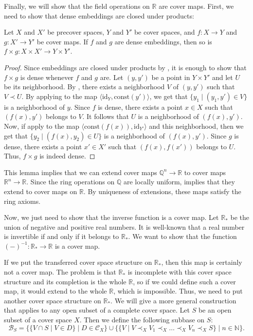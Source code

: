 \documentclass[reqno]{amsart}
\theoremstyle{definition}
\theoremstyle{remark}
\numberwithin{figure}{section}
\newcommand{\rb}{\prec}
\begin{document}
Finally, we will show that the field operations on $\mathbb{R}$ are cover maps.
First, we need to show that dense embeddings are closed under products:

\begin{lem}
Let $X$ and $X'$ be precover spaces, $Y$ and $Y'$ be cover spaces, and $f : X \to Y$ and $g : X' \to Y'$ be cover maps.
If $f$ and $g$ are dense embeddings, then so is $f \times g : X \times X' \to Y \times Y'$.
\end{lem}
\begin{proof}
Since embeddings are closed under products by , it is enough to show that $f \times g$ is dense whenever $f$ and $g$ are.
Let $(y,y')$ be a point in $Y \times Y'$ and let $U$ be its neighborhood.
By , there exists a neighborhood $V$ of $(y,y')$ such that $V \rb U$.
By applying  to the map $\langle \mathrm{id}_Y, \mathrm{const}(y') \rangle$, we get that $\{ y_1 \mid (y_1,y') \in V \}$ is a neighborhood of $y$.
Since $f$ is dense, there exists a point $x \in X$ such that $(f(x),y')$ belongs to $V$.
It follows that $U$ is a neighborhood of $(f(x),y')$.
Now, if apply  to the map $\langle \mathrm{const}(f(x)), \mathrm{id}_{Y'} \rangle$ and this neighborhood,
then we get that $\{ y_2 \mid (f(x),y_2) \in U \}$ is a neighborhood of $(f(x),y')$.
Since $g$ is dense, there exists a point $x' \in X'$ such that $(f(x),f(x'))$ belongs to $U$.
Thus, $f \times g$ is indeed dense.
\end{proof}

This lemma implies that we can extend cover maps $\mathbb{Q}^n \to \mathbb{R}$ to cover maps $\mathbb{R}^n \to \mathbb{R}$.
Since the ring operations on $\mathbb{Q}$ are locally uniform,  implies that they extend to cover maps on $\mathbb{R}$.
By uniqueness of extensions, these maps satisfy the ring axioms.

Now, we just need to show that the inverse function is a cover map.
Let $\mathbb{R}_*$ be the union of negative and positive real numbers.
It is well-known that a real number is invertible if and only if it belongs to $\mathbb{R}_*$.
We want to show that the function $(-)^{-1} : \mathbb{R}_* \to \mathbb{R}$ is a cover map.

If we put the transferred cover space structure on $\mathbb{R}_*$, then this map is certainly not a cover map.
The problem is that $\mathbb{R}_*$ is incomplete with this cover space structure and its completion is the whole $\mathbb{R}$,
so if we could define such a cover map, it would extend to the whole $\mathbb{R}$, which is impossible.
Thus, we need to put another cover space structure on $\mathbb{R}_*$.
We will give a more general construction that applies to any open subset of a complete cover space.
Let $S$ be an open subset of a cover space $X$.
Then we define the following subbase on $S$:
\[ \mathcal{B}_S = \{ \{ V \cap S \mid V \in D \} \mid D \in \mathcal{C}_X \} \cup \{ \{ V \mid V \rb_X V_1 \rb_X \ldots \rb_X V_n \rb_X S \} \mid n \in \mathbb{N} \}. \]
\end{document}
